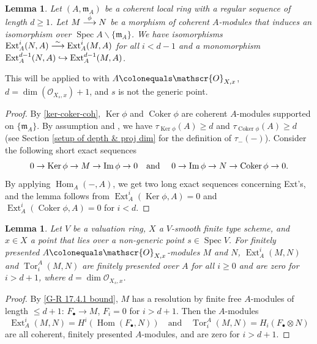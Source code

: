 \documentclass[JEP,XML,SOM,Unicode,published]{cedram}
\newcommand\hto{\mathrel{\lhook\joinrel\to}}
\newcommand\To[1]{\mathchoice{\xrightarrow{\textstyle\kern4pt#1\kern3pt}}{\stackrel{#1}{\longrightarrow}}{}{}}
\newcommand{\sbullet}{{\scriptscriptstyle\bullet}}
\let\backslash\smallsetminus
\newcommand{\fm}{\mathfrak{m}}
\newcommand{\sO}{\mathscr{O}}
\let\ce\colonequals
\let\x\text
\let\q\quad
\DeclareMathOperator{\Ker}{Ker}
\DeclareMathOperator{\Coker}{Coker}
\DeclareMathOperator{\im}{Im}
\DeclareMathOperator{\Spec}{Spec}
\DeclareMathOperator{\Hom}{Hom}
\DeclareMathOperator{\Ext}{Ext}
\DeclareMathOperator{\Tor}{Tor}
\newcommand{\bpf}{\begin{proof}}
\newcommand{\epf}{\end{proof}}
\theoremstyle{plain}
\newtheorem{lemma-tweak}[subsection]{Lemma}
\theoremstyle{definition}
\begin{document}

\begin{lemma-tweak} \label{lem on isom of Ext's}
Let $(A,\fm_A)$ be a coherent local ring with a regular sequence of length $d\geq 1$. Let $M\To{\phi}N$ be a morphism of coherent $A$\nobreakdash-mod\-ules that induces an isomorphism over $\Spec A\backslash \{\fm_A\}$.
We have isomorphisms $\Ext_{A}^i(N,A)\To{\sim} \Ext_{A}^i(M,A)$ for all $i<d-1$ and a monomorphism $\Ext_{A}^{d-1}(N,A) \hto \Ext_{A}^{d-1}(M,A)$.
\end{lemma-tweak}
This will be applied to  with $A\ce \sO_{X,x}$, $d=\dim(\sO_{X_s,x})+1$, and $s$ is not the generic point.
\bpf
By \eqref{ker-coker-coh}, $\Ker \phi$ and $\Coker \phi$ are coherent $A$\nobreakdash-mod\-ules supported on $\{\fm_A\}$. By assumption and , we have $\tau_{\Ker \phi}(A)\ge d$ and $\tau_{\Coker \phi}(A)\ge d$ (see Section \ref{setup of depth & proj dim} for the definition of $\tau_{-}(-)$). Consider the following short exact sequences
\[
\x{$0\to \Ker \phi \to M \to \im \phi \to 0$\q and \q $0\to \im \phi \to N \to \Coker \phi \to 0$.}
\]
By applying $\Hom_{A}(-,A)$, we get two long exact sequences concerning Ext's, and the lemma follows from $\Ext_{A}^i(\Ker \phi,A)=0$
and $\Ext_{A}^i(\Coker \phi,A)=0$ for $i< d$.
\epf

\begin{lemma-tweak}\label{coherence of Tor and Ext}
Let $V$ be a valuation ring, $X$ a $V$-smooth finite type scheme, and $x\in X$ a point that lies over a non-generic point $s\in \Spec V$. For finitely presented $A\ce \sO_{X,x}$\nobreakdash-mod\-ules $M$ and $N$, $\Ext_A^i(M,N)$ and $\Tor_i^A(M,N)$ are finitely presented over $A$ for all $i\ge 0$ and are zero for $i> d+1$, where $d=\dim \sO_{X_s,x}$.
\end{lemma-tweak}
\bpf
By \eqref{G-R 17.4.1 bound}, $M$ has a resolution by finite free $A$\nobreakdash-mod\-ules of length $\le d+1$: $F_{\sbullet}\to M$, $F_i=0$ for $i>d+1$.
Then the $A$\nobreakdash-mod\-ules
\[
\Ext_A^i(M,N)=H^i(\Hom(F_{\sbullet},N))\q \x{and} \q \Tor^A_i(M,N)=H_i(F_{\sbullet}\otimes N)
\]
are all coherent, \ie finitely presented $A$\nobreakdash-mod\-ules, and are zero for $i>d+1$.
\epf
\end{document}
